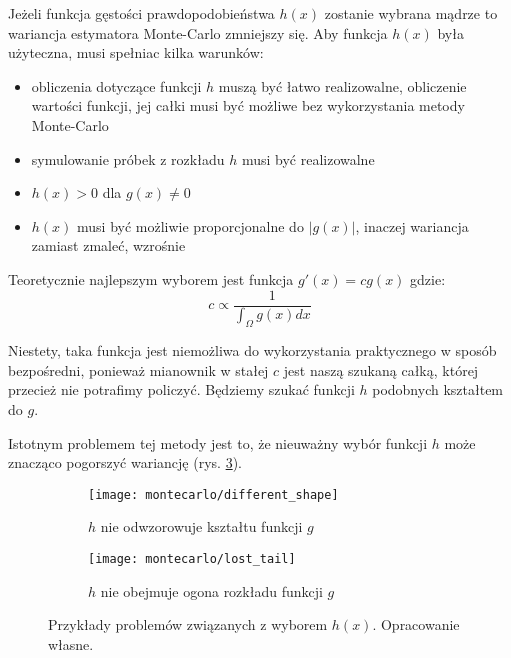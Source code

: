 \documentclass[../main.tex]{subfiles}
\begin{document}
Jeżeli funkcja gęstości prawdopodobieństwa $h(x)$ zostanie wybrana mądrze to
wariancja estymatora Monte-Carlo zmniejszy się. Aby funkcja $h(x)$ była
użyteczna, musi spełniac kilka warunków:

\begin{itemize}

  \item obliczenia dotyczące funkcji $h$ muszą być łatwo realizowalne,
    obliczenie wartości funkcji, jej całki musi być możliwe bez wykorzystania
    metody Monte-Carlo

  \item symulowanie próbek z rozkładu $h$ musi być realizowalne

  \item $h(x) > 0$ dla $g(x) \neq 0$

  \item $h(x)$ musi być możliwie proporcjonalne do $|g(x)|$, inaczej wariancja
    zamiast zmaleć, wzrośnie

\end{itemize}

Teoretycznie najlepszym wyborem jest funkcja $g'(x) = cg(x)$ gdzie:
\[
	c \propto \frac{1}{\int_{\Omega}{g(x)dx}}
\]

\noindent Niestety, taka funkcja jest niemożliwa do wykorzystania praktycznego w sposób bezpośredni, ponieważ mianownik w stałej $c$ jest naszą szukaną całką, której przecież nie potrafimy policzyć. Będziemy szukać funkcji $h$ podobnych kształtem do $g$.

Istotnym problemem tej metody jest to, że nieuważny wybór funkcji $h$ może
znacząco pogorszyć wariancję (rys. \ref{fig:ImportanceSamplingProblems}).

\begin{figure}
  \centering

  \begin{subfigure}[t]{0.45\textwidth}
    \texttt{[image: montecarlo/different\_shape]}
    \label{fig:ImportanceSamplingWrongFunction}
    \caption{$h$ nie odwzorowuje kształtu funkcji $g$}
  \end{subfigure}
  \begin{subfigure}[t]{0.45\textwidth}
    \centering
    \texttt{[image: montecarlo/lost\_tail]}
    \label{fig:ImportanceSamplingLostTail}
    \caption{$h$ nie obejmuje ogona rozkładu funkcji $g$}
  \end{subfigure}

  \caption{Przykłady problemów związanych z wyborem $h(x)$. Opracowanie własne.}
  \label{fig:ImportanceSamplingProblems}
\end{figure}
\end{document}
